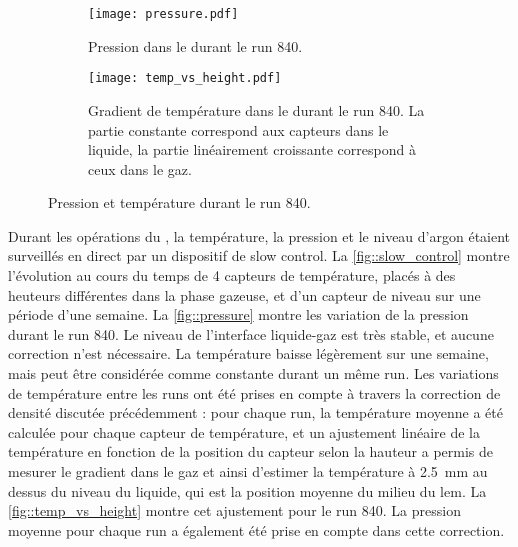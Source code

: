       \begin{figure}[htbp]
        \centering
        \begin{subfigure}[t]{0.48\textwidth}
          \centering
          \texttt{[image: pressure.pdf]}
          \caption{\label{fig::pressure}Pression dans le \TOO{} durant le run 840.}
        \end{subfigure}\hfill
        \begin{subfigure}[t]{0.48\textwidth}
          \centering
          \texttt{[image: temp\_vs\_height.pdf]}
          \caption{\label{fig::temp_vs_height}Gradient de température dans le \TOO{} durant le run 840. La partie constante correspond aux capteurs dans le liquide, la partie linéairement croissante correspond à ceux dans le gaz.}
        \end{subfigure}
        \caption[Pression et température durant le run 840]{Pression et température durant le run 840.}
      \end{figure}
      
      Durant les opérations du \TOO{}, la température, la pression et le niveau d'argon étaient surveillés en direct par un dispositif de slow control. La \autoref{fig::slow_control} montre l'évolution au cours du temps de 4 capteurs de température, placés à des heuteurs différentes dans la phase gazeuse, et d'un capteur de niveau sur une période d'une semaine. La \autoref{fig::pressure} montre les variation de la pression durant le run 840. Le niveau de l'interface liquide-gaz est très stable, et aucune correction n'est nécessaire. La température baisse légèrement sur une semaine, mais peut être considérée comme constante durant un même run. Les variations de température entre les runs ont été prises en compte à travers la correction de densité discutée précédemment : pour chaque run, la température moyenne a été calculée pour chaque capteur de température, et un ajustement linéaire de la température en fonction de la position du capteur selon la hauteur a permis de mesurer le gradient dans le gaz et ainsi d'estimer la température à \SI{2.5}{\milli\meter} au dessus du niveau du liquide, qui est la position moyenne du milieu du \gls{lem}. La \autoref{fig::temp_vs_height} montre cet ajustement pour le run 840. La pression moyenne pour chaque run a également été prise en compte dans cette correction.

